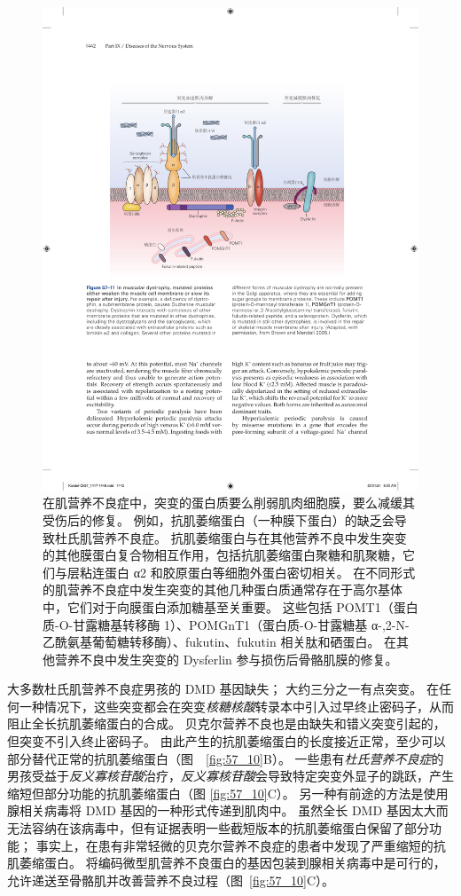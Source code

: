 \begin{figure}[htbp]
	\centering
	\includegraphics[width=0.8\linewidth]{chap57/fig_57_11}
	\caption{在肌营养不良症中，突变的蛋白质要么削弱肌肉细胞膜，要么减缓其受伤后的修复。
		例如，抗肌萎缩蛋白（一种膜下蛋白）的缺乏会导致杜氏肌营养不良症。
		抗肌萎缩蛋白与在其他营养不良中发生突变的其他膜蛋白复合物相互作用，包括抗肌萎缩蛋白聚糖和肌聚糖，它们与层粘连蛋白 α2 和胶原蛋白等细胞外蛋白密切相关。
		在不同形式的肌营养不良症中发生突变的其他几种蛋白质通常存在于高尔基体中，它们对于向膜蛋白添加糖基至关重要。
		这些包括 POMT1（蛋白质-O-甘露糖基转移酶 1）、POMGnT1（蛋白质-O-甘露糖基 α-,2-N-乙酰氨基葡萄糖转移酶）、fukutin、fukutin 相关肽和硒蛋白。
		在其他营养不良中发生突变的 Dysferlin 参与损伤后骨骼肌膜的修复\cite{brown2005harrison}。}
	\label{fig:57_11}
\end{figure}


大多数杜氏肌营养不良症男孩的 DMD 基因缺失；
大约三分之一有点突变。
在任何一种情况下，这些突变都会在突变\textit{核糖核酸}转录本中引入过早终止密码子，从而阻止全长抗肌萎缩蛋白的合成。
贝克尔营养不良也是由缺失和错义突变引起的，但突变不引入终止密码子。
由此产生的抗肌萎缩蛋白的长度接近正常，至少可以部分替代正常的抗肌萎缩蛋白（图~~\ref{fig:57_10}B）。
一些患有\textit{杜氏营养不良症}的男孩受益于\textit{反义寡核苷酸}治疗，\textit{反义寡核苷酸}会导致特定突变外显子的跳跃，产生缩短但部分功能的抗肌萎缩蛋白（图 \ref{fig:57_10}C）。
另一种有前途的方法是使用腺相关病毒将 DMD 基因的一种形式传递到肌肉中。
虽然全长 DMD 基因太大而无法容纳在该病毒中，但有证据表明一些截短版本的抗肌萎缩蛋白保留了部分功能；
事实上，在患有非常轻微的贝克尔营养不良症的患者中发现了严重缩短的抗肌萎缩蛋白。
将编码微型肌营养不良蛋白的基因包装到腺相关病毒中是可行的，允许递送至骨骼肌并改善营养不良过程（图~\ref{fig:57_10}C）。


